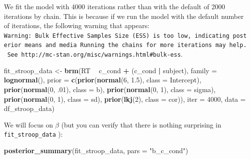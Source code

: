 \documentclass[12pt,]{krantz}
\newenvironment{Shaded}{\begin{snugshade}}{\end{snugshade}}
\newcommand{\DataTypeTok}[1]{\textcolor[rgb]{0.13,0.29,0.53}{#1}}
\newcommand{\DecValTok}[1]{\textcolor[rgb]{0.00,0.00,0.81}{#1}}
\newcommand{\FloatTok}[1]{\textcolor[rgb]{0.00,0.00,0.81}{#1}}
\newcommand{\KeywordTok}[1]{\textcolor[rgb]{0.13,0.29,0.53}{\textbf{#1}}}
\newcommand{\NormalTok}[1]{#1}
\newcommand{\OperatorTok}[1]{\textcolor[rgb]{0.81,0.36,0.00}{\textbf{#1}}}
\newcommand{\StringTok}[1]{\textcolor[rgb]{0.31,0.60,0.02}{#1}}
\theoremstyle{definition}
\theoremstyle{definition}
\theoremstyle{definition}
\theoremstyle{remark}
\begin{document}
We fit the model with 4000 iterations rather than with the default of 2000 iterations by chain. This is because if we run the model with the default number of iterations, the following warning that appears: \texttt{Warning:\ Bulk\ Effective\ Samples\ Size\ (ESS)\ is\ too\ low,\ indicating\ posterior\ means\ and\ media\ Running\ the\ chains\ for\ more\ iterations\ may\ help.\ See\ http://mc-stan.org/misc/warnings.html\#bulk-ess}.

\begin{Shaded}
\begin{Highlighting}[]
\NormalTok{fit_stroop_data <-}\StringTok{ }\KeywordTok{brm}\NormalTok{(RT }\OperatorTok{~}\StringTok{ }\NormalTok{c_cond }\OperatorTok{+}\StringTok{ }\NormalTok{(c_cond }\OperatorTok{|}\StringTok{ }\NormalTok{subject),}
                   \DataTypeTok{family =} \KeywordTok{lognormal}\NormalTok{(),}
                  \DataTypeTok{prior =}
                      \KeywordTok{c}\NormalTok{(}\KeywordTok{prior}\NormalTok{(}\KeywordTok{normal}\NormalTok{(}\DecValTok{6}\NormalTok{, }\FloatTok{1.5}\NormalTok{), }\DataTypeTok{class =}\NormalTok{ Intercept),}
                        \KeywordTok{prior}\NormalTok{(}\KeywordTok{normal}\NormalTok{(}\DecValTok{0}\NormalTok{, }\FloatTok{.01}\NormalTok{), }\DataTypeTok{class =}\NormalTok{ b),}
                        \KeywordTok{prior}\NormalTok{(}\KeywordTok{normal}\NormalTok{(}\DecValTok{0}\NormalTok{, }\DecValTok{1}\NormalTok{), }\DataTypeTok{class =}\NormalTok{ sigma),}
                        \KeywordTok{prior}\NormalTok{(}\KeywordTok{normal}\NormalTok{(}\DecValTok{0}\NormalTok{, }\DecValTok{1}\NormalTok{), }\DataTypeTok{class =}\NormalTok{ sd),}
                        \KeywordTok{prior}\NormalTok{(}\KeywordTok{lkj}\NormalTok{(}\DecValTok{2}\NormalTok{), }\DataTypeTok{class =}\NormalTok{ cor)),}
                  \DataTypeTok{iter =} \DecValTok{4000}\NormalTok{,}
                  \DataTypeTok{data =}\NormalTok{ df_stroop_data)}
\end{Highlighting}
\end{Shaded}

We will focus on \(\beta\) (but you can verify that there is nothing surprising in \texttt{fit\_stroop\_data} ):

\begin{Shaded}
\begin{Highlighting}[]
\KeywordTok{posterior_summary}\NormalTok{(fit_stroop_data, }\DataTypeTok{pars =} \StringTok{"b_c_cond"}\NormalTok{)}
\end{Highlighting}
\end{Shaded}
\end{document}
